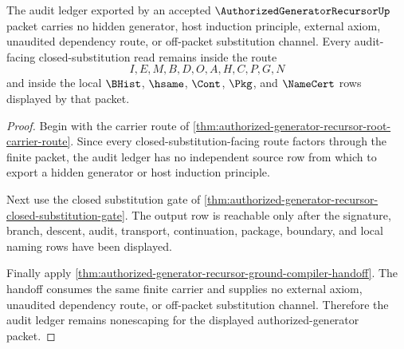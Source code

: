\begin{theorem}
\label{thm:authorized-generator-recursor-audit-ledger-nonescape}
The audit ledger exported by an accepted $\AuthorizedGeneratorRecursorUp$ packet carries no hidden generator, host induction principle, external axiom, unaudited dependency route, or off-packet substitution channel. Every audit-facing closed-substitution read remains inside the route
$$
I,E,M,B,D,O,A,H,C,P,G,N
$$
and inside the local $\BHist$, $\hsame$, $\Cont$, $\Pkg$, and $\NameCert$ rows displayed by that packet.
\end{theorem}
\begin{proof}
Begin with the carrier route of \autoref{thm:authorized-generator-recursor-root-carrier-route}. Since every closed-substitution-facing route factors through the finite packet, the audit ledger has no independent source row from which to export a hidden generator or host induction principle.

Next use the closed substitution gate of \autoref{thm:authorized-generator-recursor-closed-substitution-gate}. The output row is reachable only after the signature, branch, descent, audit, transport, continuation, package, boundary, and local naming rows have been displayed.

Finally apply \autoref{thm:authorized-generator-recursor-ground-compiler-handoff}. The handoff consumes the same finite carrier and supplies no external axiom, unaudited dependency route, or off-packet substitution channel. Therefore the audit ledger remains nonescaping for the displayed authorized-generator packet.
\end{proof}


